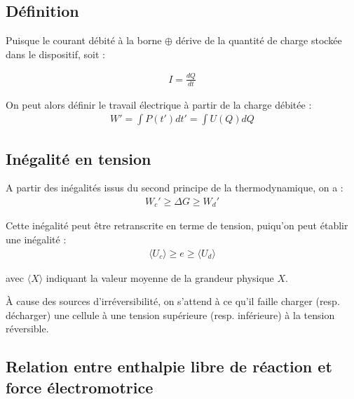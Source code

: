 \subsection{Définition}


Puisque le courant débité à la borne $\oplus$ dérive de la quantité de charge stockée dans le dispositif, soit :

\begin{align*}
I = \frac{dQ}{dt}
\end{align*}

On peut alors définir le travail électrique à partir de la charge débitée : 
\begin{align*}
W' = \int P(t') dt' = \int U(Q) dQ
\end{align*}



\subsection{Inégalité en tension}
A partir des inégalités issus du second principe de la thermodynamique, on a :
\begin{align*}
W_c ' \geq \Delta G \geq W_d '
\end{align*}

Cette inégalité peut être retranscrite en terme de tension, puiqu'on peut établir une inégalité : 
\begin{align*}
\langle U_c \rangle \geq e \geq \langle U_d \rangle
\end{align*}

avec $\langle X \rangle$ indiquant la valeur moyenne de la grandeur physique $X$.

\`{A} cause des sources d'irréversibilité, on s'attend à ce qu'il faille charger (resp. décharger) une cellule à une tension supérieure (resp. inférieure) à la tension réversible.

\subsection{Relation entre enthalpie libre de réaction et force électromotrice}

